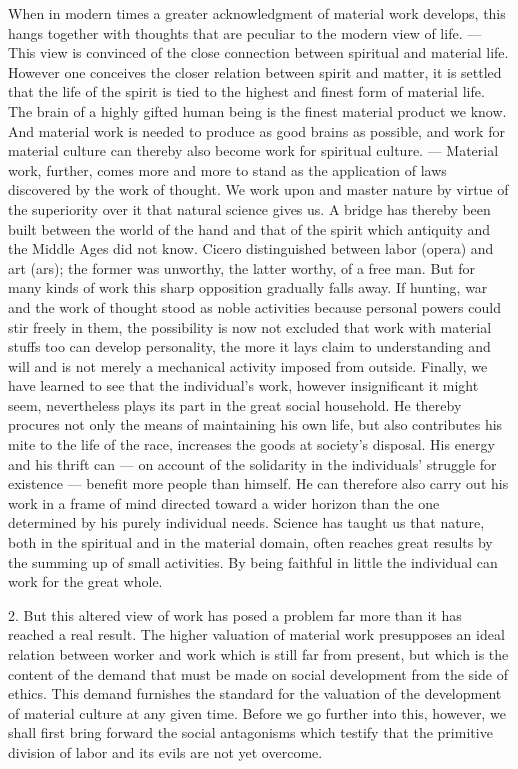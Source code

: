 \documentclass[12pt,a4paper,openany]{book}
\newcommand{\opage}[1]{\marginnote{\footnotesize\textit{[#1]}}}
\begin{document}
\opage{360}When in modern times a greater acknowledgment of material work develops, this hangs together with thoughts
that are peculiar to the modern view of life. --- This view is convinced of the close connection between spiritual and
material life. However one conceives the closer relation between spirit and matter, it is settled that the life of the
spirit is tied to the highest and finest form of material life. The brain of a highly gifted human being is the finest
material product we know. And material work is needed to produce as good brains as possible, and work for material
culture can thereby also become work for spiritual culture. --- Material work, further, comes more and more to stand as
the application of laws discovered by the work of thought. We work upon and master nature by virtue of the superiority
over it that natural science gives us. A bridge has thereby been built between the world of the hand and that of the
spirit which antiquity and the Middle Ages did not know. Cicero distinguished between labor (opera) and art (ars); the
former was unworthy, the latter worthy, of a free man. But for many kinds of work this sharp opposition gradually falls
away. If hunting, war and the work of thought stood as noble activities because personal powers could stir freely in
them, the possibility is now not excluded that work with material stuffs too can develop personality, the more it lays
claim to understanding and will and is not merely a mechanical activity imposed from outside. Finally, we have learned to
see that the individual's work, however insignificant it might seem, nevertheless plays its part in the great social
household. He thereby procures not only the means of maintaining his own life, but also contributes his mite to the life
of the race, increases the goods at society's disposal. His energy and his thrift can --- on account of the solidarity in
the individuals' struggle for existence --- benefit more people than himself. He can therefore also carry out his work in
a frame of mind directed toward a wider horizon than the one determined by his purely individual needs. Science has
taught us that nature, both in the spiritual and in the material domain, often reaches
\opage{361}great results by the summing up of small activities. By being faithful in little the individual can work for
the great whole.%

2. But this altered view of work has posed a problem far more than it has reached a real result. The higher valuation of
material work presupposes an ideal relation between worker and work which is still far from present, but which is the
content of the demand that must be made on social development from the side of ethics. This demand furnishes the
standard for the valuation of the development of material culture at any given time. Before we go further into this,
however, we shall first bring forward the social antagonisms which testify that the primitive division of labor and its
evils are not yet overcome.
\end{document}

